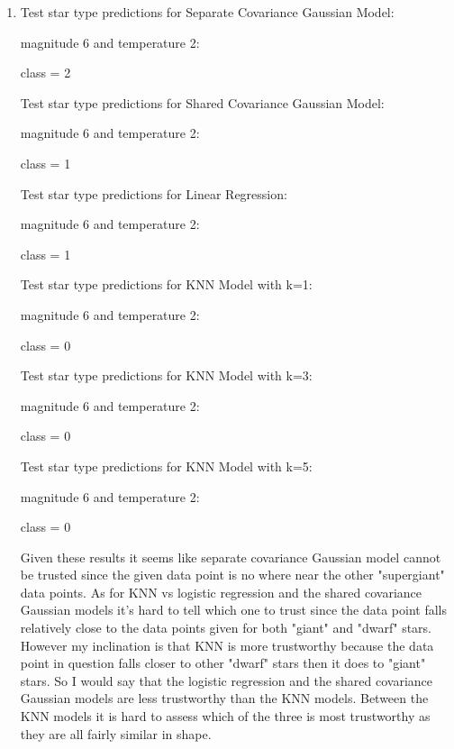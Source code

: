 \documentclass[submit]{harvardml}
\begin{document}
\begin{enumerate}
        \item
        Test star type predictions for Separate Covariance Gaussian Model:
        
        magnitude 6 and temperature 2: 
        
        class = 2
        
        Test star type predictions for Shared Covariance Gaussian Model:
        
        magnitude 6 and temperature 2: 
        
        class =  1
        
        Test star type predictions for Linear Regression:
        
        magnitude 6 and temperature 2: 
        
        class =  1
        
        Test star type predictions for KNN Model with k=1:
        
        magnitude 6 and temperature 2: 
        
        class =  0
        
        Test star type predictions for KNN Model with k=3:
        
        magnitude 6 and temperature 2:
        
        class =  0
        
        Test star type predictions for KNN Model with k=5: 
        
        magnitude 6 and temperature 2:
        
        class =  0

    Given these results it seems like separate covariance Gaussian model cannot be trusted since the given data point is no where near the other "supergiant" data points.
    As for KNN vs logistic regression and the shared covariance Gaussian models it's hard to tell which one to trust since the data point falls relatively close to the data points given for both "giant" and "dwarf" stars. However my inclination is that KNN is more trustworthy because the data point in question falls closer to other "dwarf" stars then it does to "giant" stars. So I would say that the logistic regression and the shared covariance Gaussian models are less trustworthy than the KNN models. Between the KNN models it is hard to assess which of the three is most trustworthy as they are all fairly similar in shape.
\end{enumerate}
\newpage
\end{document}
